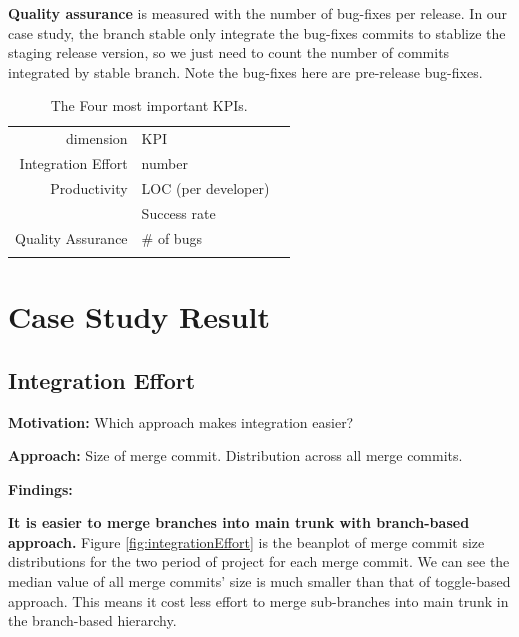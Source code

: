 \textbf{Quality assurance} is measured with the number of bug-fixes per release. In our case study, the branch stable only integrate the bug-fixes commits to stablize the staging release version, so we just need to count the number of commits integrated by stable branch. Note the bug-fixes here are pre-release bug-fixes.



\begin{table}
\caption{The Four most important KPIs.}
\label{tab:KPI}       %
\begin{tabular}{rll}
\hline\noalign{\smallskip}
dimension & KPI   \\
\noalign{\smallskip}\hline\noalign{\smallskip}
Integration Effort & number \\
Productivity & LOC (per developer) \\
 & Success rate \\
Quality Assurance & \# of bugs \\
\noalign{\smallskip}\hline
\end{tabular}
\end{table}


\section{Case Study Result}
\label{sec:result}

\subsection{Integration Effort}

\textbf{Motivation:} 
Which approach makes integration easier?

\textbf{Approach:}
Size of merge commit. Distribution across all merge commits.

\textbf{Findings:} 

\textbf{It is easier to merge branches into main trunk with branch-based approach.} Figure \ref{fig:integrationEffort} is the beanplot of merge commit size distributions for the two period of project for each merge commit. We can see the median value of all merge commits' size is much smaller than that of toggle-based approach. This means it cost less effort to merge sub-branches into main trunk in the branch-based hierarchy. 

